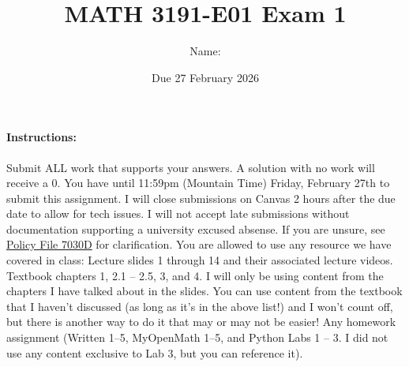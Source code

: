 \documentclass[12pt,addpoints]{exam}
\title{MATH 3191-E01 Exam 1}
\date{Due 27 February 2026}
\author{Name: \rule{150pt}{1pt}}
\begin{document}
   \maketitle

    \paragraph{Instructions:} Submit ALL work that supports your answers. A solution with no work will
    receive a $0$. You have until 11:59pm (Mountain Time) Friday, February 27th to submit this assignment.
    I will close submissions on Canvas 2 hours after the due date to allow for tech issues. I will not
    accept late submissions without documentation supporting a university excused absense. If you are
    unsure, see \href{https://www.ucdenver.edu/docs/librariesprovider284/default-document-library/7030d---student-attendance-and-absences---cu-denver02fbb186-4b01-4e15-af21-2ab4bbaac065.pdf?sfvrsn=f1001eb4_1}
    {Policy File 7030D} for clarification. You are allowed to use any resource we have covered in
    class: Lecture slides 1 through 14 and their associated lecture videos. Textbook chapters 1, 2.1 -- 2.5, 3, and 4.
    I will only be using content from the chapters I have talked about in the slides. You can use content from the
    textbook that I haven't discussed (as long as it's in the above list!) and I won't count off,
    but there is another way to do it that may or may not be easier! Any homework assignment
    (Written 1--5, MyOpenMath 1--5, and Python Labs 1 -- 3. I did not use any content exclusive
    to Lab 3, but you can reference it).
\end{document}
